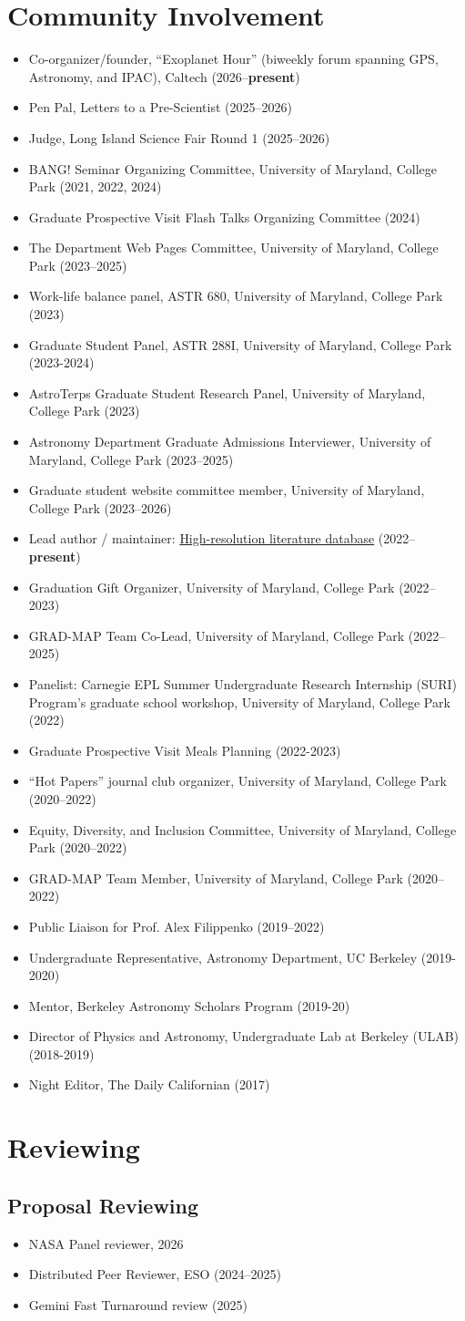 \documentclass[letterpaper,12pt]{article}
\newcommand{\shorterSection}[1]{\section{#1}}
\renewcommand{\small}{\normalsize}
\newcommand{\resumeItem}[2]{
  \item\small{
    \textbf{#1}{#2 \vspace{-2pt}}
  }
}
\newcommand{\resumeItemListStart}{\begin{itemize}}
\newcommand{\resumeItemListEnd}{\end{itemize}\vspace{-5pt}}
\begin{document}
\shorterSection{Community Involvement}
\resumeItemListStart
\resumeItem{}{Co-organizer/founder, ``Exoplanet Hour'' (biweekly forum spanning GPS, Astronomy, and IPAC), Caltech (2026--\textbf{present})}
\resumeItem{}{Pen Pal, Letters to a Pre-Scientist (2025--2026)}
\resumeItem{}{Judge, Long Island Science Fair Round 1 (2025--2026)}
\resumeItem{}{BANG! Seminar Organizing Committee, University of Maryland, College Park (2021, 2022, 2024)}
\resumeItem{}{Graduate Prospective Visit Flash Talks Organizing Committee (2024)}
\resumeItem{}{The Department Web Pages Committee, University of Maryland, College Park (2023--2025)}
\resumeItem{}{Work-life balance panel, ASTR 680, University of Maryland, College Park (2023)}
\resumeItem{}{Graduate Student Panel, ASTR 288I, University of Maryland, College Park (2023-2024)}
\resumeItem{}{AstroTerps Graduate Student Research Panel, University of Maryland, College Park (2023)}
\resumeItem{}{Astronomy Department Graduate Admissions Interviewer, University of Maryland, College Park (2023--2025)}
\resumeItem{}{Graduate student website committee member, University of Maryland, College Park (2023--2026)}
\resumeItem{}{Lead author / maintainer: \href{https://www.arjunsavel.com/hires_papers.html}{High-resolution literature database} (2022--\textbf{present})}
\resumeItem{}{Graduation Gift Organizer, University of Maryland, College Park (2022--2023)}
\resumeItem{}{GRAD-MAP Team Co-Lead, University of Maryland, College Park (2022--2025)}
\resumeItem{}{Panelist: Carnegie EPL Summer Undergraduate Research Internship (SURI) Program’s graduate school workshop, University of Maryland, College Park (2022)}
\resumeItem{}{Graduate Prospective Visit Meals Planning (2022-2023)}
\resumeItem{}{``Hot Papers'' journal club organizer, University of Maryland, College Park (2020--2022)}
\resumeItem{}{Equity, Diversity, and Inclusion Committee, University of Maryland, College Park (2020--2022)}
\resumeItem{}{GRAD-MAP Team Member, University of Maryland, College Park (2020--2022)}
\resumeItem{}{Public Liaison for Prof. Alex Filippenko (2019--2022)}
\resumeItem{}{Undergraduate Representative, Astronomy Department, UC Berkeley (2019-2020)}
\resumeItem{}{Mentor, Berkeley Astronomy Scholars Program (2019-20)}
\resumeItem{}{Director of Physics and Astronomy, Undergraduate Lab at Berkeley (ULAB) (2018-2019)}
\resumeItem{}{Night Editor, The Daily Californian (2017)}
\resumeItemListEnd


\shorterSection{Reviewing}
\subsection{Proposal Reviewing}
\resumeItemListStart
\resumeItem{}{NASA Panel reviewer, 2026}
\resumeItem{}{Distributed Peer Reviewer, ESO (2024--2025)}
\resumeItem{}{Gemini Fast Turnaround review (2025)}
\resumeItemListEnd
\end{document}
